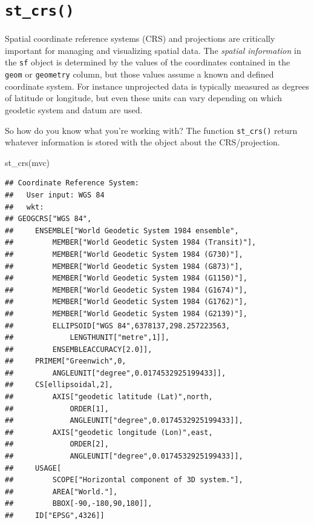\documentclass[
]{book}
\newenvironment{Shaded}{\begin{snugshade}}{\end{snugshade}}
\newcommand{\FunctionTok}[1]{\textcolor[rgb]{0.00,0.00,0.00}{#1}}
\newcommand{\NormalTok}[1]{#1}
\begin{document}
\hypertarget{st_crs}{%
\section{\texorpdfstring{\texttt{st\_crs()}}{st\_crs()}}\label{st_crs}}

Spatial coordinate reference systems (CRS) and projections are critically important for managing and visualizing spatial data. The \emph{spatial information} in the \texttt{sf} object is determined by the values of the coordinates contained in the \texttt{geom} or \texttt{geometry} column, but those values assume a known and defined coordinate system. For instance unprojected data is typically measured as degrees of latitude or longitude, but even these units can vary depending on which geodetic system and datum are used.

So how do you know what you're working with? The function \texttt{st\_crs()} return whatever information is stored with the object about the CRS/projection.

\begin{Shaded}
\begin{Highlighting}[]
\FunctionTok{st\_crs}\NormalTok{(mvc)}
\end{Highlighting}
\end{Shaded}

\begin{verbatim}
## Coordinate Reference System:
##   User input: WGS 84 
##   wkt:
## GEOGCRS["WGS 84",
##     ENSEMBLE["World Geodetic System 1984 ensemble",
##         MEMBER["World Geodetic System 1984 (Transit)"],
##         MEMBER["World Geodetic System 1984 (G730)"],
##         MEMBER["World Geodetic System 1984 (G873)"],
##         MEMBER["World Geodetic System 1984 (G1150)"],
##         MEMBER["World Geodetic System 1984 (G1674)"],
##         MEMBER["World Geodetic System 1984 (G1762)"],
##         MEMBER["World Geodetic System 1984 (G2139)"],
##         ELLIPSOID["WGS 84",6378137,298.257223563,
##             LENGTHUNIT["metre",1]],
##         ENSEMBLEACCURACY[2.0]],
##     PRIMEM["Greenwich",0,
##         ANGLEUNIT["degree",0.0174532925199433]],
##     CS[ellipsoidal,2],
##         AXIS["geodetic latitude (Lat)",north,
##             ORDER[1],
##             ANGLEUNIT["degree",0.0174532925199433]],
##         AXIS["geodetic longitude (Lon)",east,
##             ORDER[2],
##             ANGLEUNIT["degree",0.0174532925199433]],
##     USAGE[
##         SCOPE["Horizontal component of 3D system."],
##         AREA["World."],
##         BBOX[-90,-180,90,180]],
##     ID["EPSG",4326]]
\end{verbatim}
\end{document}
